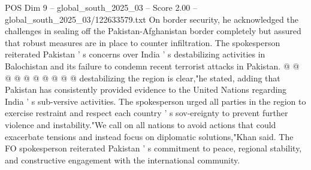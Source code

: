 \begin{textsample}{POS Dim 9 – global\_south\_2025\_03 – Score 2.00 – global\_south\_2025\_03/122633579.txt}
On border security, he acknowledged the challenges in sealing off the Pakistan-Afghanistan border completely but assured that robust measures are in place to counter infiltration.
The spokesperson reiterated Pakistan ' s concerns over India ' s destabilizing activities in Balochistan and its failure to condemn recent terrorist attacks in Pakistan. @ @ @ @ @ @ @ @ @ @ destabilizing the region is clear,"he stated, adding that Pakistan has consistently provided evidence to the United Nations regarding India ' s sub-versive activities.
The spokesperson urged all parties in the region to exercise restraint and respect each country ' s sov-ereignty to prevent further violence and instability."We call on all nations to avoid actions that could exacerbate tensions and instead focus on diplomatic solutions,"Khan said.
The FO spokesperson reiterated Pakistan ' s commitment to peace, regional stability, and constructive engagement with the international community.

\end{textsample}
